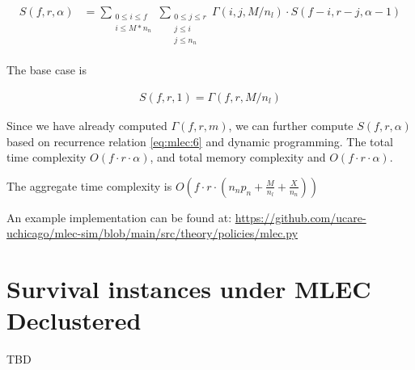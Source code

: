 \documentclass{article}
\begin{document}
\begin{eqnarray}
\begin{aligned}
  S(f,r,\alpha)
  &= \sum_{\substack{0 \leq i \leq f \\ i \leq M*n_n}}
  \sum_{\substack{0 \leq j \leq r \\ j \leq i \\ j \leq n_n}}
  \Gamma(i,j,M/n_l) \cdot S(f-i, r-j, \alpha-1)
\end{aligned}
\label{eq:mlec:6}
\end{eqnarray}

The base case is 

\begin{eqnarray}
  S(f,r,1) =  \Gamma(f,r,M/n_l)
\label{eq:mlec:7}
\end{eqnarray}

Since we have already computed $\Gamma(f,r,m)$, we can further compute $S(f,r,\alpha)$ based on recurrence relation \ref{eq:mlec:6} and dynamic programming. The total time complexity $O(f \cdot r \cdot \alpha)$, and total memory complexity and $O(f \cdot r \cdot \alpha)$.

The aggregate time complexity is $O(f \cdot r \cdot (n_n p_n + \frac{M}{n_l} + \frac{X}{n_n}))$

An example implementation can be found at: \url{https://github.com/ucare-uchicago/mlec-sim/blob/main/src/theory/policies/mlec.py}







\section{Survival instances under MLEC Declustered}

TBD
\end{document}
